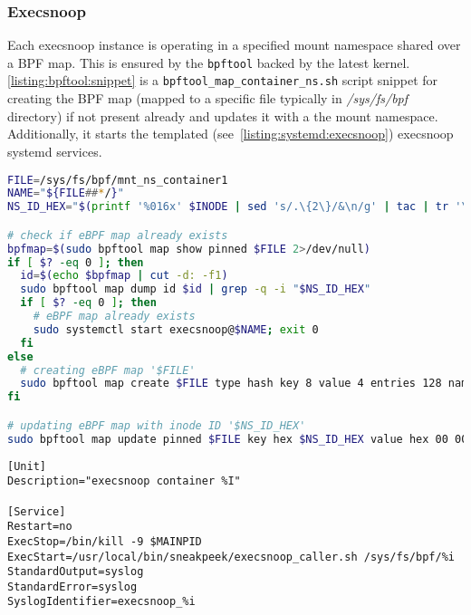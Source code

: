 \subsubsection*{Execsnoop \label{implementation:mon:hunting:execsnoop}}
Each execsnoop instance is operating in a specified mount namespace shared over a BPF map. This is ensured by the \texttt{bpftool} backed by the latest kernel. \autoref{listing:bpftool:snippet} is a \texttt{bpftool\_map\_container\_ns.sh} script snippet for creating the BPF map (mapped to a specific file typically in \textit{/sys/fs/bpf} directory) if not present already and updates it with a the mount namespace. Additionally, it starts the templated (see~\autoref{listing:systemd:execsnoop}) execsnoop systemd services.

\begin{lstlisting}[language=bash, style=custom, caption={Setup of BPF map for sharing the mount namespave with execsnoop instance. INODE variable is retrieved using the command sequence specified in \autoref{listing:sneakpeek:mntns}.}, label=listing:bpftool:snippet]
FILE=/sys/fs/bpf/mnt_ns_container1
NAME="${FILE##*/}"
NS_ID_HEX="$(printf '%016x' $INODE | sed 's/.\{2\}/&\n/g' | tac | tr '\n' ' ')"

# check if eBPF map already exists
bpfmap=$(sudo bpftool map show pinned $FILE 2>/dev/null)
if [ $? -eq 0 ]; then
  id=$(echo $bpfmap | cut -d: -f1)
  sudo bpftool map dump id $id | grep -q -i "$NS_ID_HEX"
  if [ $? -eq 0 ]; then
    # eBPF map already exists
    sudo systemctl start execsnoop@$NAME; exit 0
  fi
else
  # creating eBPF map '$FILE'
  sudo bpftool map create $FILE type hash key 8 value 4 entries 128 name $NAME flags 0
fi

# updating eBPF map with inode ID '$NS_ID_HEX'
sudo bpftool map update pinned $FILE key hex $NS_ID_HEX value hex 00 00 00 00 any
\end{lstlisting}

\begin{lstlisting}[language=Clean, style=custom, caption={Execsnoop templated systemd unit file. It executes a caller script running the execsnoop program. Program output is redirected to the local syslog server and in a custom configuration the stream is writen to file based on the "SyslogIdentifier".}, label=listing:systemd:execsnoop]
[Unit]
Description="execsnoop container %I"

[Service]
Restart=no
ExecStop=/bin/kill -9 $MAINPID
ExecStart=/usr/local/bin/sneakpeek/execsnoop_caller.sh /sys/fs/bpf/%i
StandardOutput=syslog
StandardError=syslog
SyslogIdentifier=execsnoop_%i
\end{lstlisting}

